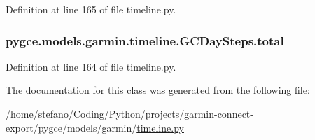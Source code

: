 Definition at line 165 of file timeline.\+py.

\subsubsection[{\texorpdfstring{total}{total}}]{\setlength{\rightskip}{0pt plus 5cm}pygce.\+models.\+garmin.\+timeline.\+G\+C\+Day\+Steps.\+total}\hypertarget{classpygce_1_1models_1_1garmin_1_1timeline_1_1_g_c_day_steps_accaf8fa0f07a44164f5e2ee3a4c5fca7}{}\label{classpygce_1_1models_1_1garmin_1_1timeline_1_1_g_c_day_steps_accaf8fa0f07a44164f5e2ee3a4c5fca7}


Definition at line 164 of file timeline.\+py.



The documentation for this class was generated from the following file\+:\begin{DoxyCompactItemize}
\item 
/home/stefano/\+Coding/\+Python/projects/garmin-\/connect-\/export/pygce/models/garmin/\hyperlink{timeline_8py}{timeline.\+py}\end{DoxyCompactItemize}

